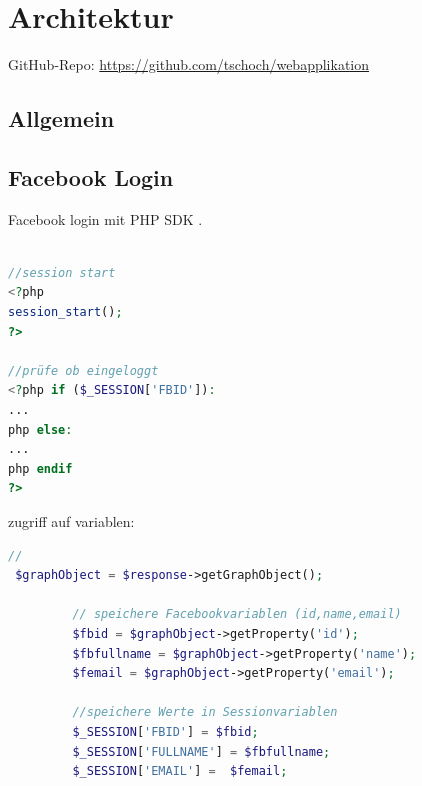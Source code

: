 \documentclass[11pt,a4paper]{scrreprt}
\begin{document}
\newpage
 


 
 

\chapter{Architektur}
GitHub-Repo: \url{https://github.com/tschoch/webapplikation}
\section{Allgemein}


\section{Facebook Login}
Facebook login mit PHP SDK \cite{phpsdk}.

\begin{lstlisting}[language=PHP, frame=single, captionpos=b,caption= search\_list.php]

//session start
<?php
session_start(); 
?>

//prüfe ob eingeloggt
<?php if ($_SESSION['FBID']):
...
php else: 
...
php endif 
?> 
\end{lstlisting}

\noindent
zugriff auf variablen:
\begin{lstlisting}[language=PHP, frame=single, captionpos=b,caption= fbconfig.php]
 // 
 $graphObject = $response->getGraphObject();
  
         // speichere Facebookvariablen (id,name,email)
         $fbid = $graphObject->getProperty('id');
         $fbfullname = $graphObject->getProperty('name');
         $femail = $graphObject->getProperty('email');
         
         //speichere Werte in Sessionvariablen
         $_SESSION['FBID'] = $fbid;
         $_SESSION['FULLNAME'] = $fbfullname;
         $_SESSION['EMAIL'] =  $femail;
 	    
\end{lstlisting}
\end{document}
